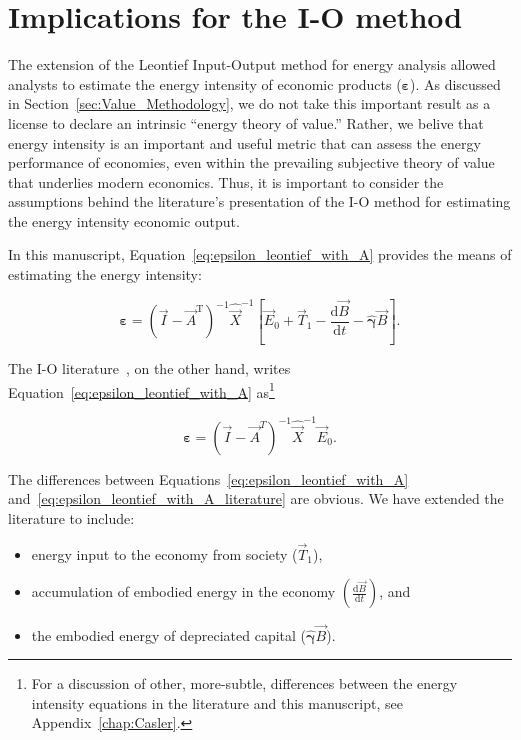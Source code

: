 \section{Implications for the I-O method}
\label{sec:Implications_for_IO}

The extension of the Leontief Input-Output method
for energy analysis allowed analysts to estimate 
the energy intensity 
of economic products ($\bm{\varepsilon}$). 
As discussed in Section~\ref{sec:Value_Methodology},
we do not take this important result as a license
to declare an intrinsic ``energy theory of value.''
Rather, we belive that energy intensity is an 
important and useful metric that can assess 
the energy performance of economies,
even within the prevailing subjective theory of value
that underlies modern economics. 
Thus, it is important to consider the assumptions behind
the literature's presentation of the I-O method 
for estimating the energy intensity economic output.

In this manuscript, Equation~\ref{eq:epsilon_leontief_with_A} 
provides the means of estimating the energy intensity:

\begin{equation*}
	\bm{\varepsilon} 
	= {(\vec{I} - \vec{A}^{\mathrm{T}})}^{-1}\hat{\vec{X}}^{-1}
		\left[\vec{E}_{0} 
				+ \vec{T}_{1} 
				- \frac{\mathrm{d}\vec{B}}{\mathrm{d}t} 
				- \hat{\bm{\gamma}}\vec{B}
		\right].
\end{equation*}

\noindent{}The I-O literature~\cite{Bullard1975,Casler1984}, 
on the other hand, 
writes Equation~\ref{eq:epsilon_leontief_with_A} 
as\footnote{For a discussion of other, more-subtle, differences
between the energy intensity equations in the literature
and this manuscript, see Appendix~\ref{chap:Casler}.}

\begin{equation} \label{eq:epsilon_leontief_with_A_literature}
	\bm{\varepsilon} 
	= {(\vec{I} - \vec{A}^{T})}^{-1}
	\hat{\vec{X}}^{-1}
	\vec{E}_{0}.
\end{equation}

The differences between Equations~\ref{eq:epsilon_leontief_with_A}
and~\ref{eq:epsilon_leontief_with_A_literature} are obvious. 
We have extended the literature to include:

\begin{itemize}
	\item{energy input to the economy from society ($\vec{T}_{1}$),}
	\item{accumulation of embodied energy in the economy 
	$\left( \frac{\mathrm{d}\vec{B}}{\mathrm{d}t} \right)$, and}
	\item{the embodied energy of depreciated capital ($\hat{\bm{\gamma}}\vec{B}$).}
\end{itemize}

